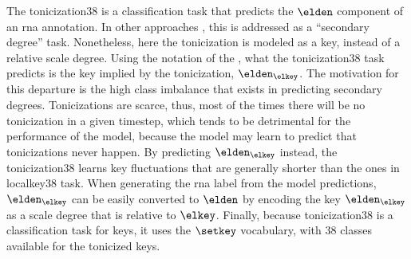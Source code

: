

The \gls{tonicization38} is a classification task that
predicts the $\elden$ component of an \gls{rna} annotation.
In other approaches
\parencite{chen2021attend,micchi2021deep}, this is addressed
as a ``secondary degree'' task. Nonetheless, here the
tonicization is modeled as a key, instead of a relative
scale degree. Using the notation of the
, what
the \gls{tonicization38} task predicts is the key implied by
the tonicization, $\elden_{\elkey}$. The motivation for this
departure is the high class imbalance that exists in
predicting secondary degrees. Tonicizations are scarce,
thus, most of the times there will be no tonicization in a
given timestep, which tends to be detrimental for the
performance of the model, because the model may learn to
predict that tonicizations never happen. By predicting
$\elden_{\elkey}$ instead, the \gls{tonicization38} learns
key fluctuations that are generally shorter than the ones in
\gls{localkey38} task. When generating the \gls{rna} label
from the model predictions, $\elden_{\elkey}$ can be easily
converted to $\elden$ by encoding the key $\elden_{\elkey}$
as a scale degree that is relative to $\elkey$. Finally,
because \gls{tonicization38} is a classification task for
keys, it uses the $\setkey$ vocabulary, with 38 classes
available for the tonicized keys.


